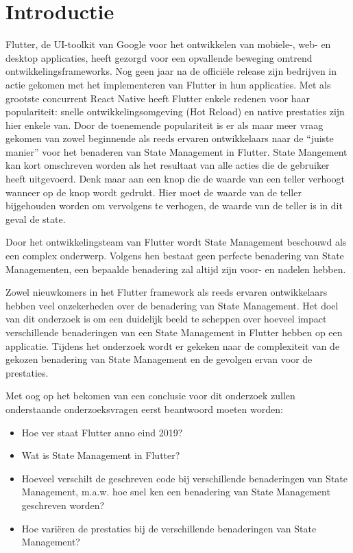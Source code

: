
\section{Introductie} %
\label{sec:introductie}

Flutter, de UI-toolkit van Google voor het ontwikkelen van mobiele-, web- en desktop applicaties,
heeft gezorgd voor een opvallende beweging omtrend ontwikkelingsframeworks.
Nog geen jaar na de officiële release zijn bedrijven in actie gekomen met het implementeren van Flutter
in hun applicaties.
Met als grootste concurrent React Native heeft Flutter enkele redenen voor haar populariteit: snelle ontwikkelingsomgeving (Hot Reload) en native prestaties zijn hier enkele van.
Door de toenemende populariteit is er als maar meer vraag gekomen van zowel beginnende als
reeds ervaren ontwikkelaars naar de ``juiste manier'' voor het benaderen van State Management in Flutter.
State Mangement kan kort omschreven worden als het resultaat van alle acties die de gebruiker heeft
uitgevoerd.
Denk maar aan een knop die de waarde van een teller verhoogt wanneer op de knop wordt gedrukt. Hier moet de waarde van de teller bijgehouden worden om vervolgens te verhogen, de waarde van de teller is in dit geval de state.

Door het ontwikkelingsteam van Flutter wordt State Management beschouwd als een complex onderwerp. Volgens hen bestaat geen perfecte benadering van State Managementen, een bepaalde benadering zal altijd zijn voor- en nadelen hebben.

Zowel nieuwkomers in het Flutter framework als reeds ervaren ontwikkelaars hebben 
veel onzekerheden over de benadering van State Management.
Het doel van dit onderzoek is om een duidelijk beeld te scheppen over hoeveel impact
verschillende benaderingen van een State Management in Flutter hebben op een applicatie.
Tijdens het onderzoek wordt er gekeken naar de complexiteit van de gekozen benadering van State Management en de gevolgen ervan voor de prestaties.

Met oog op het bekomen van een conclusie voor dit onderzoek
zullen onderstaande onderzoeksvragen eerst beantwoord moeten worden:
\begin{itemize}
    \item Hoe ver staat Flutter anno eind 2019?
    \item Wat is State Management in Flutter?
    \item Hoeveel verschilt de geschreven code bij verschillende benaderingen van State Management, m.a.w. hoe snel 
    ken een benadering van State Management geschreven worden?
    \item Hoe variëren de prestaties bij de verschillende benaderingen van State Management?
\end{itemize}
    
